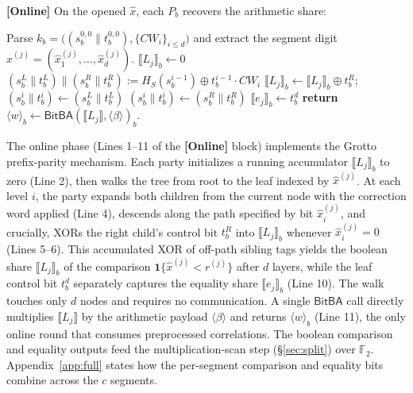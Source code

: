 \documentclass[journal]{IEEEtran}
\theoremstyle{definition}
\theoremstyle{plain}
\newcommand{\F}{\mathbb{F}}
\newcommand{\ashare}[1]{\langle #1 \rangle}             %
\newcommand{\bshare}[1]{\llbracket #1 \rrbracket}        %
\newcommand{\BitBA}{\mathsf{BitBA}}
\newcommand{\ind}[1]{\mathbf{1}\{#1\}}
\newcommand{\xhat}{\hat{x}}
\newcommand{\seg}[1]{^{\scriptscriptstyle(#1)}}   %
\newcommand{\nseg}{c}                              %
\begin{document}
\begin{algorithm}[t]
\vspace{0.3em}
\textbf{[Online]} On the opened $\hat{x}$, each $P_b$ recovers the arithmetic share:
\begin{algorithmic}[1]
\State Parse $k_b=\big((s^{0,0}_b\|t^{0,0}_b),\{\mathit{CW}_i\}_{i\le d}\big)$ and extract the segment digit $\xhat\seg{j}=(\xhat\seg{j}_1,\dots,\xhat\seg{j}_d)$.
\State $\bshare{L_j}_b\gets 0$ 
\State $(s^L_b\|t^L_b)\|(s^R_b\|t^R_b) := H_S(s^{i-1}_b) \oplus t^{i-1}_b\cdot\mathit{CW}_i$ 
\If{$\xhat\seg{j}_i = 0$}
\State $\bshare{L_j}_b \gets \bshare{L_j}_b \oplus t^R_b$; $(s^i_b\|t^i_b)\gets(s^L_b\|t^L_b)$ 
\Else
\State $(s^i_b\|t^i_b)\gets(s^R_b\|t^R_b)$ 
\EndIf
\EndFor
\State $\bshare{e_j}_b \gets t^d_b$ 
\State \textbf{return} $\ashare{w}_b\gets\BitBA(\bshare{L_j},\ashare{\beta})_b$.
\end{algorithmic}
\end{algorithm}

The online phase (Lines 1--11 of the \textbf{[Online]} block) implements the
Grotto prefix-parity mechanism. Each party initializes a running accumulator
$\bshare{L_j}_b$ to zero (Line 2), then walks the tree from root to the leaf
indexed by $\xhat\seg{j}$. At each level $i$, the party expands both children
from the current node with the correction word applied (Line 4), descends along
the path specified by bit $\xhat\seg{j}_i$, and crucially, XORs the right child's
control bit $t^R_b$ into $\bshare{L_j}_b$ whenever $\xhat\seg{j}_i=0$ (Lines 5--6).
This accumulated XOR of off-path sibling tags yields the boolean share
$\bshare{L_j}_b$ of the comparison $\ind{\xhat\seg{j}<r\seg{j}}$ after $d$ layers,
while the leaf control bit $t^d_b$ separately captures the equality share
$\bshare{e_j}_b$ (Line 10). The walk touches only $d$ nodes and requires no
communication. A single $\BitBA$ call directly multiplies $\bshare{L_j}$ by
the arithmetic payload $\ashare{\beta}$ and returns $\ashare{w}_b$ (Line 11),
the only online round that consumes preprocessed correlations. The boolean
comparison and equality outputs feed the multiplication-scan step
(\S\ref{sec:split}) over $\F_2$. Appendix~\ref{app:full} states how the
per-segment comparison and equality bits combine across the $\nseg$ segments.
\end{document}
